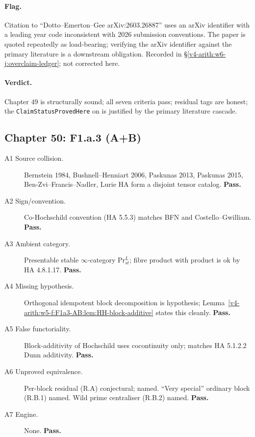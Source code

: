 \paragraph{Flag.} Citation to ``Dotto--Emerton--Gee arXiv:2603.26887''
uses an arXiv identifier with a leading year code inconsistent with
2026 submission conventions. The paper is quoted repeatedly as
load-bearing; verifying the arXiv identifier against the primary
literature is a downstream obligation. Recorded in
\S\ref{v4-arith:w6-j:overclaim-ledger}; not corrected here.

\paragraph{Verdict.} Chapter 49 is structurally sound; all seven
criteria pass; residual tags are honest; the
\texttt{ClaimStatusProvedHere} on
 is justified by the primary
literature cascade.

\subsection{Chapter 50: F1.a.3 (A+B)}
\label{v4-arith:w6-j:ch50}

\begin{description}
\item[A1 Source collision.] Bernstein 1984, Bushnell--Henniart 2006,
Paskunas 2013, Paskunas 2015, Ben-Zvi--Francis--Nadler, Lurie HA
form a disjoint tensor catalog. \textbf{Pass.}
\item[A2 Sign/convention.] Co-Hochschild convention (HA 5.5.3)
matches BFN and Costello--Gwilliam. \textbf{Pass.}
\item[A3 Ambient category.] Presentable stable \(\infty\)-category
Pr\({}^{L}_{st}\); fibre product with product is ok by HA 4.8.1.17.
\textbf{Pass.}
\item[A4 Missing hypothesis.] Orthogonal idempotent block
decomposition is hypothesis; Lemma~\ref{v4-arith:w5-f:F1a3-AB:lem:HH-block-additive}
states this cleanly. \textbf{Pass.}
\item[A5 False functoriality.] Block-additivity of Hochschild uses
cocontinuity only; matches HA 5.1.2.2 Dunn additivity. \textbf{Pass.}
\item[A6 Unproved equivalence.] Per-block residual (R.A)
conjectural; named. ``Very special'' ordinary block (R.B.1) named.
Wild prime centraliser (R.B.2) named. \textbf{Pass.}
\item[A7 Engine.] None. \textbf{Pass.}
\end{description}

